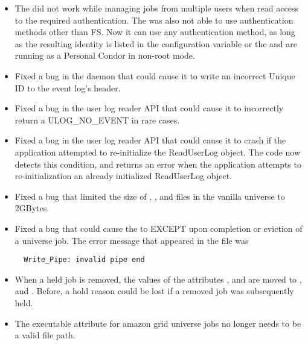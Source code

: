 \begin{itemize}
\item The  did not work while managing jobs from
multiple users when read access to the  required
authentication.  The  was also not able to use
authentication methods other than FS.  Now it can use any
authentication method, as long as the resulting identity is listed in
the configuration variable
 or the  and
 are running as a Personal Condor in non-root mode.


\item Fixed a bug in the  daemon that could cause it to write
  an incorrect Unique ID to the event log's header.

\item Fixed a bug in the user log reader API that could cause it to
  incorrectly return a ULOG\_NO\_EVENT in rare cases.

\item Fixed a bug in the user log reader API that could cause it to
  crash if the application attempted to re-initialize the ReadUserLog
  object.  The code now detects this condition, and returns an error
  when the application attempts to re-initialization an already
  initialized ReadUserLog object.

\item Fixed a bug that limited the size of , ,
and  files in the vanilla universe to 2GBytes.

\item Fixed a bug that could cause the  to EXCEPT upon 
completion or eviction of a  universe job.
The error message that appeared in the  file was
\begin{verbatim}
  Write_Pipe: invalid pipe end
\end{verbatim}

\item When a held job is removed, the values of the attributes
,  and 
are moved to ,  and
. Before, a hold reason could be lost if a
removed job was subsequently held.

\item The executable attribute for amazon grid universe jobs no longer
needs to be a valid file path.


\end{itemize}
